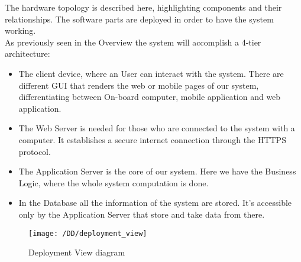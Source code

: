 The hardware topology is described here, highlighting components and their relationships. The software parts are deployed in order to have the system working.
\\As previously seen in the Overview the system will accomplish a 4-tier architecture:
\begin{itemize}
	\item{The client device, where an User can interact with the system. There are different GUI that renders the web or mobile pages of our system, differentiating between On-board computer, mobile application and web application.}
	\item{ The Web Server is needed for those who are connected to the system with a computer. It establishes a secure internet connection through the HTTPS protocol.}
	\item{The Application Server is the core of our system. Here we have the Business Logic, where the whole system computation is done.}
	\item{In the Database all the information of the system are stored. It's accessible only by the Application Server that store and take data from there.}
\end{itemize} 

\newpage
\begin{figure}[!ht]
  \centering
  \vspace{0.1cm}
  \texttt{[image: /DD/deployment\_view]}\\
  \vspace{0.1cm}
  \caption{Deployment View diagram} 
  \label{fig:DeploymentView} 
\end{figure}
